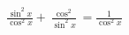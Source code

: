 \documentclass[preview]{standalone}
\begin{document}
\begin{align*}
\frac{\sin^2x}{\cos^2x}+\frac{\cos^2}{\sin^2x}=\frac{1}{\cos^2x}
\end{align*}
\end{document}
